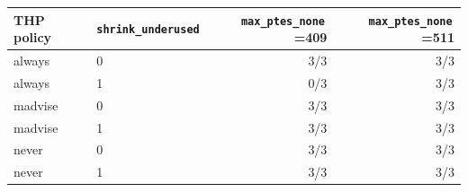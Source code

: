 \begin{tabular}{llrr}
\toprule
THP policy & \texttt{shrink\_underused} & \texttt{max\_ptes\_none}\,=409 & \texttt{max\_ptes\_none}\,=511 \\
\midrule
always & 0 & 3/3 & 3/3 \\
always & 1 & 0/3 & 3/3 \\
madvise & 0 & 3/3 & 3/3 \\
madvise & 1 & 3/3 & 3/3 \\
never & 0 & 3/3 & 3/3 \\
never & 1 & 3/3 & 3/3 \\
\bottomrule
\end{tabular}
